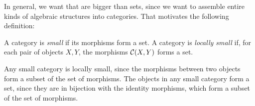 


In general, we want  that are bigger than sets, since
we want to assemble entire kinds of algebraic structures into categories. That
motivates the following definition:

\begin{dfn*}
	A category is \emph{small} if its morphisms form a set. A category is
	\emph{locally small} if, for each pair of objects $X, Y$, the morphisms
	$\mathcal{C}(X, Y)$ forms a set.
\end{dfn*}

Any small category is locally small, since the morphisms between two objects
form a subset of the set of morphisms. The objects in any small category form a
set, since they are in bijection with the identity morphisms, which form a
subset of the set of morphisms.


